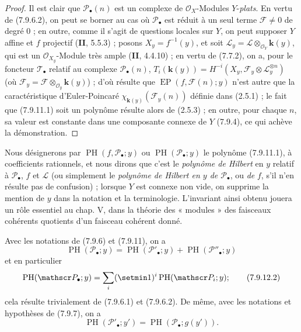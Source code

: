 \begin{proof}
Il est clair que $\mathscr P_\bullet(n)$ est un complexe de
$\mathscr O_X$-Modules $Y$-\emph{plats}. En vertu de (7.9.6.2), on peut se borner au cas
où $\mathscr P_\bullet$ est réduit à un seul terme $\mathscr F\ne0$ de degré 0 ;
en outre, comme il s'agit de questions locales sur $Y$, on peut supposer $Y$
affine et $f$ projectif (\textbf{II}, 5.5.3) ; posons $X_y=f^{-1}(y)$, et soit
$\mathscr L_y=\mathscr L\otimes_{\mathscr O_Y}\boldsymbol{k}(y)$, qui est un
$\mathscr O_{X_y}$-Module très ample (\textbf{II}, 4.4.10) ; en vertu de (7.7.2), on a,
pour le foncteur $\mathscr T_\bullet$ relatif au complexe
$\mathscr P_\bullet(n)$, $T_i(\boldsymbol{k}(y))=H^{-i}(X_y,\mathscr F_y\otimes\mathscr L_y^{\otimes n})$
(où $\mathscr F_y=\mathscr F\otimes_{\mathscr O_y}\boldsymbol{k}(y)$) ;
d'où résulte que $\operatorname{EP}(f,\mathscr F(n);y)$ n'est autre que la
caractéristique d'Euler-Poincaré $\chi_{\mathbf{k}(y)}(\mathscr F_y(n))$ définie dans
(2.5.1) ; le fait que (7.9.11.1) soit un polynôme résulte alors de (2.5.3) ; en
outre, pour chaque $n$, sa valeur est constante dans une composante connexe de
$Y$ (7.9.4), ce qui achève la démonstration.
\end{proof}

Nous désignerons par $\operatorname{PH}(f,\mathscr P_\bullet;y)$ ou
$\operatorname{PH}(\mathscr P_\bullet;y)$ le polynôme (7.9.11.1), à coefficients
rationnels, et nous dirons que c'est le \emph{polynôme de Hilbert} en $y$
relatif à $\mathscr P_\bullet$, $f$ et $\mathscr L$ (ou simplement le
\emph{polynôme de Hilbert en $y$ de $\mathscr P_\bullet$}, ou \emph{de} $f$, s'il n'en
résulte pas de confusion) ; lorsque $Y$ est connexe non vide, on supprime la
mention de $y$ dans la notation et la terminologie. L'invariant ainsi obtenu
jouera un rôle essentiel au chap. V, dans la théorie des « modules » des
faisceaux cohérents quotients d'un faisceau cohérent donné.

\begin{env}[7.9.12]
\label{III.7.9.12.fr}
Avec les notations de (7.9.6) et (7.9.11), on a
\[
  \operatorname{PH}(\mathscr P_\bullet;y)
  =\operatorname{PH}(\mathscr P'_\bullet;y)
  +\operatorname{PH}(\mathscr P''_\bullet;y)
  \tag{7.9.12.1}\label{III.7.9.12.1.fr}
\]
et en particulier
\[
  \operatorname{PH}(\mathscr P_\bullet;y)
  =\sum_i(\setmin 1)^i\operatorname{PH}(\mathscr P_i;y) ;
  \tag{7.9.12.2}\label{III.7.9.12.2.fr}
\]
cela résulte trivialement de (7.9.6.1) et (7.9.6.2). De même, avec les notations
et hypothèses de (7.9.7), on a
\[
  \operatorname{PH}(\mathscr P'_\bullet;y')
  =\operatorname{PH}(\mathscr P_\bullet;g(y')).
  \tag{7.9.12.3}\label{III.7.9.12.3.fr}
\]
\end{env}

